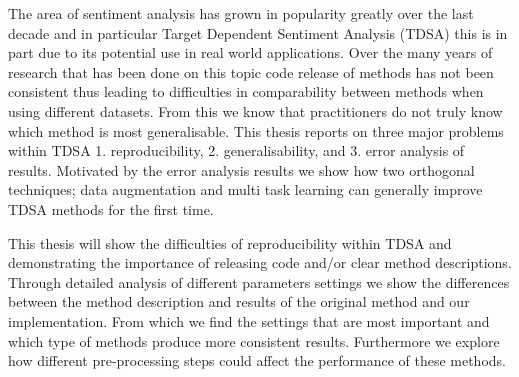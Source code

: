 

The area of sentiment analysis has grown in popularity greatly over the last decade and in particular Target Dependent Sentiment Analysis (TDSA) this is in part due to its potential use in real world applications. Over the many years of research that has been done on this topic code release of methods has not been consistent thus leading to difficulties in comparability between methods when using different datasets. From this we know that practitioners do not truly know which method is most generalisable. This thesis reports on three major problems within TDSA 1. reproducibility, 2. generalisability, and 3. error analysis of results. Motivated by the error analysis results we show how two orthogonal techniques; data augmentation and multi task learning can generally improve TDSA methods for the first time.



This thesis will show the difficulties of reproducibility within TDSA and demonstrating the importance of releasing code and/or clear method descriptions. Through detailed analysis of different parameters settings we show the differences between the method description and results of the original method and our implementation. From which we find the settings that are most important and which type of methods produce more consistent results. Furthermore we explore how different pre-processing steps could affect the performance of these methods.\\

